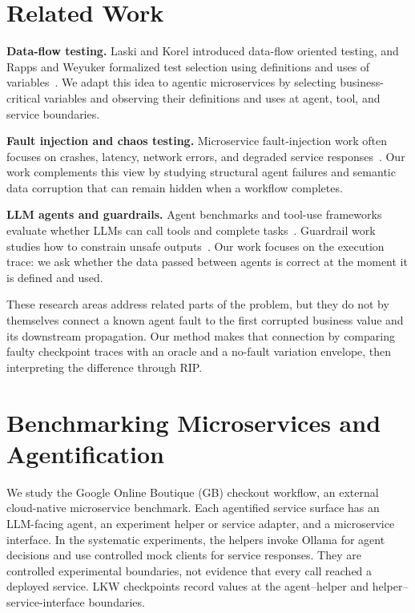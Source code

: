 \documentclass[sigconf,review,anonymous,balance=false]{acmart}
\begin{document}
\section{Related Work}

\textbf{Data-flow testing.} Laski and Korel introduced data-flow oriented
testing, and Rapps and Weyuker formalized test selection using definitions and
uses of variables~\cite{lkw,rapps-weyuker}. We adapt this idea to agentic
microservices by selecting business-critical variables and observing their
definitions and uses at agent, tool, and service boundaries.

\textbf{Fault injection and chaos testing.} Microservice fault-injection work
often focuses on crashes, latency, network errors, and degraded service
responses~\cite{chaosengineering,microservicefi,istio}. Our work complements
this view by studying structural agent failures and semantic data corruption
that can remain hidden when a workflow completes.

\textbf{LLM agents and guardrails.} Agent benchmarks and tool-use frameworks
evaluate whether LLMs can call tools and complete tasks~\cite{react,agentbench,
toolbench,langgraph,autogen}. Guardrail work studies how to constrain unsafe
outputs~\cite{nemoguar,llmguardrails}. Our work focuses on the execution trace:
we ask whether the data passed between agents is correct at the moment it is
defined and used.

These research areas address related parts of the problem, but they do not by
themselves connect a known agent fault to the first corrupted business value
and its downstream propagation. Our method makes that connection by comparing
faulty checkpoint traces with an oracle and a no-fault variation envelope, then
interpreting the difference through RIP.

\section{Benchmarking Microservices and Agentification}
\label{sec:benchmarks}

We study the Google Online Boutique (GB) checkout workflow, an external
cloud-native microservice benchmark. Each agentified service surface has an
LLM-facing agent, an experiment helper or service adapter, and a microservice
interface. In the systematic experiments, the helpers invoke Ollama for agent
decisions and use controlled mock clients for service responses. They are
controlled experimental boundaries, not evidence that every call reached a
deployed service. LKW checkpoints record values at the agent--helper and
helper--service-interface boundaries.
\end{document}
